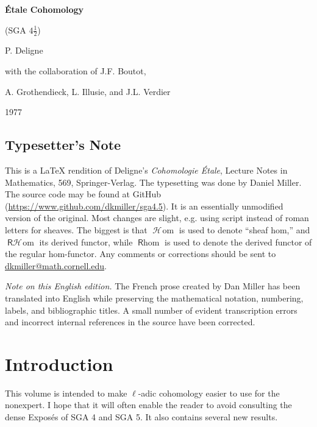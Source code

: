 \documentclass[12pt,oneside,english]{smfbook}
\DeclareMathOperator{\Hom}{\mathcal{H}\!om} %
\DeclareMathOperator{\rHom}{\mathsf{R}\mathcal{H}\!om}
\DeclareMathOperator{\rhom}{\mathsf{R}\hom}
\begin{document}
\frontmatter
\pagestyle{plain}
\begin{titlepage}
\thispagestyle{empty}
\centering
\vspace*{0.24\textheight}
{\LARGE\bfseries Étale Cohomology\par}
\vspace{20pt}
{\Large (SGA $4\frac 1 2$)\par}
\vspace{28pt}
{\large P. Deligne\par}
\vspace{12pt}
{\normalsize with the collaboration of J.F. Boutot,\par
A. Grothendieck, L. Illusie, and J.L. Verdier\par}
\vfill
{\normalsize 1977\par}
\end{titlepage}

\clearpage
\section*{Typesetter's Note}

This is a \LaTeX{} rendition of Deligne's \emph{Cohomologie \'Etale}, Lecture Notes in Mathematics, 569, Springer-Verlag. The typesetting was done by Daniel Miller. The source code may be found at GitHub (\url{https://www.github.com/dkmiller/sga4.5}). It is an essentially unmodified version of the original. Most changes are slight, e.g. using script instead of roman letters for sheaves. The biggest is that $\Hom$ is used to denote ``sheaf hom,'' and $\rHom$ its derived functor, while $\rhom$ is used to denote the derived functor of the regular hom-functor. Any comments or corrections should be sent to \url{dkmiller@math.cornell.edu}.

\medskip
\noindent\textit{Note on this English edition.}
The French prose created by Dan Miller has been translated into English while preserving the mathematical notation, numbering, labels, and bibliographic titles. A small number of evident transcription errors and incorrect internal references in the source have been corrected.
\clearpage
\clearpage
\chapter*{Introduction}

This volume is intended to make $\ell$-adic cohomology easier to use for the nonexpert. I hope that it will often enable the reader to avoid consulting the dense Exposés of SGA 4 and SGA 5. It also contains several new results.
\end{document}
